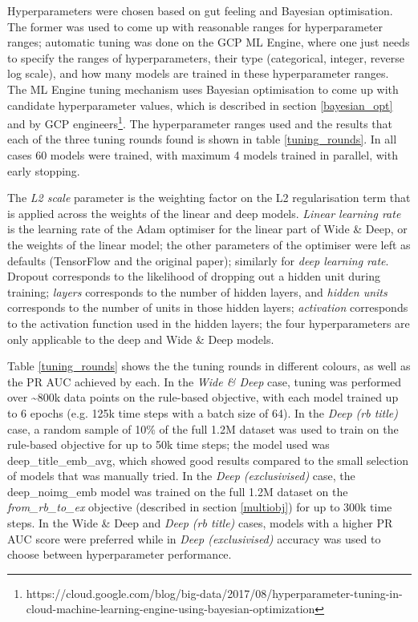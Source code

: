 Hyperparameters were chosen based on gut feeling and Bayesian optimisation.
The former was used to come up with reasonable ranges for hyperparameter ranges; automatic tuning was done on the GCP ML Engine, where one just needs to specify the ranges of hyperparameters, their type (categorical, integer, reverse log scale), and how many models are trained in these hyperparameter ranges.
The ML Engine tuning mechanism uses Bayesian optimisation to come up with candidate hyperparameter values, which is described in section \ref{bayesian_opt} and by GCP engineers\footnote{https://cloud.google.com/blog/big-data/2017/08/hyperparameter-tuning-in-cloud-machine-learning-engine-using-bayesian-optimization}.
The hyperparameter ranges used and the results that each of the three tuning rounds found is shown in table \ref{tuning_rounds}.
In all cases 60 models were trained, with maximum 4 models trained in parallel, with early stopping.

The \textit{L2 scale} parameter is the weighting factor on the L2 regularisation term that is applied across the weights of the linear and deep models.
\textit{Linear learning rate} is the learning rate of the Adam optimiser for the linear part of Wide \& Deep, or the weights of the linear model; the other parameters of the optimiser were left as defaults (TensorFlow and the original paper); similarly for \textit{deep learning rate}.
Dropout corresponds to the likelihood of dropping out a hidden unit during training; \textit{layers} corresponds to the number of hidden layers, and \textit{hidden units} corresponds to the number of units in those hidden layers; \textit{activation} corresponds to the activation function used in the hidden layers; the four hyperparameters are only applicable to the deep and Wide \& Deep models.

Table \ref{tuning_rounds} shows the the tuning rounds in different colours, as well as the PR AUC achieved by each.
In the \textit{Wide \& Deep} case, tuning was performed over \textasciitilde800k data points on the rule-based objective, with each model trained up to 6 epochs (e.g. 125k time steps with a batch size of 64).
In the \textit{Deep (rb title)} case, a random sample of 10\% of the full 1.2M dataset was used to train on the rule-based objective for up to 50k time steps; the model used was deep\_title\_emb\_avg, which showed good results compared to the small selection of models that was manually tried.
In the \textit{Deep (exclusivised)} case, the deep\_noimg\_emb model was trained on the full 1.2M dataset on the \textit{from\_rb\_to\_ex} objective (described in section \ref{multiobj}) for up to 300k time steps.
In the {Wide \& Deep} and \textit{Deep (rb title)} cases, models with a higher PR AUC score were preferred while in \textit{Deep (exclusivised)} accuracy was used to choose between hyperparameter performance.

